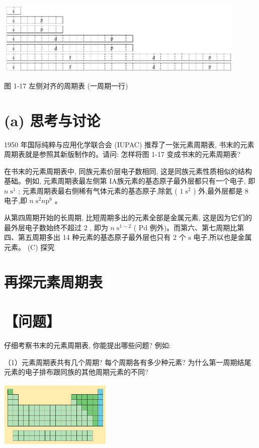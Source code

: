 \documentclass[10pt]{article}
\begin{document}
\begin{center}
\includegraphics[max width=0.9\textwidth]{images/0190e026-5a11-7df7-bd27-54d09026ba7a_23_708524.jpg}
\end{center}

图 1-17 左侧对齐的周期表 (一周期一行)

\section*{(a) 思考与讨论}

1950 年国际纯粹与应用化学联合会 (IUPAC) 推荐了一张元素周期表, 书末的元素周期表就是参照其新版制作的。请问: 怎样将图 1-17 变成书末的元素周期表?

在书末的元素周期表中, 同族元素价层电子数相同, 这是同族元素性质相似的结构基础。例如, 元素周期表最左侧第 IA族元素的基态原子最外层都只有一个电子, 即 \(n{\mathrm{\;s}}^{1}\) ; 元素周期表最右侧稀有气体元素的基态原子,除氦 ( \(1{\mathrm{\;s}}^{2}\) ) 外,最外层都是 8 电子,即 \(n{\mathrm{\;s}}^{2}n{\mathrm{p}}^{6}\) 。

从第四周期开始的长周期, 比短周期多出的元素全部是金属元素, 这是因为它们的最外层电子数始终不超过 2 , 即为 \(n{\mathrm{\;s}}^{1 \sim 2}\) ( \(\mathrm{{Pd}}\) 例外)。而第六、第七周期比第四、第五周期多出 14 种元素的基态原子最外层也只有 2 个 \(\mathrm{s}\) 电子,所以也是金属元素。 (C) 探究

\section*{再探元素周期表}

\section*{【问题】}

仔细考察书末的元素周期表, 你能提出哪些问题? 例如:

（1）元素周期表共有几个周期? 每个周期各有多少种元素? 为什么第一周期结尾元素的电子排布跟同族的其他周期元素的不同?

\begin{center}
\includegraphics[max width=0.4\textwidth]{images/0190e026-5a11-7df7-bd27-54d09026ba7a_24_331990.jpg}
\end{center}
\end{document}
